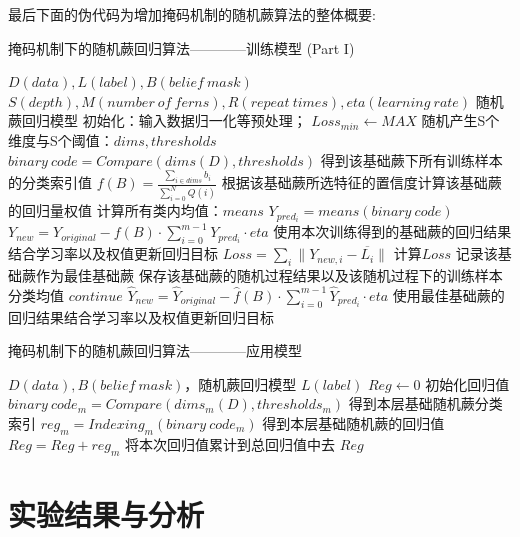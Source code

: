 最后下面的伪代码为增加掩码机制的随机蕨算法的整体概要:

\begin{algorithm}
\caption{掩码机制下的随机蕨回归算法————训练模型 (Part I)}
\begin{algorithmic}[1]
\Require $D(data), L(label), B(belief\ mask)$
\Require $S(depth), M(number\ of\ ferns), R(repeat\ times), eta(learning\ rate)$
\Ensure 随机蕨回归模型
\State 初始化：输入数据归一化等预处理；
	\State $Loss_{min}\leftarrow MAX$
		\State 随机产生S个维度与S个阈值：$dims, thresholds$
		\State $binary\ code=Compare(dims(D), thresholds)$
		\State \Comment 得到该基础蕨下所有训练样本的分类索引值
		\State $f(B)=\frac{\sum_{i\in dims} b_i}{\sum_{i=0}^{N} Q(i)}$
		\State \Comment 根据该基础蕨所选特征的置信度计算该基础蕨的回归量权值
		\State 计算所有类内均值：$means$
		\State $Y_{pred_i}=means(binary\ code)$
		\State $Y_{new}=Y_{original}-f(B)\cdot \sum_{i=0}^{m-1} Y_{pred_i}\cdot eta$
		\State \Comment 使用本次训练得到的基础蕨的回归结果结合学习率以及权值更新回归目标
		\State $Loss=\sum_i{\|Y_{new,i}-\overline{L_i}\|}$
		\State \Comment 计算$Loss$
			\State 记录该基础蕨作为最佳基础蕨
			\State 保存该基础蕨的随机过程结果以及该随机过程下的训练样本分类均值
		\Else 
			\State $continue$
		\EndIf
	\State $\hat{Y}_{new}=\hat{Y}_{original}-\hat{f}(B)\cdot \sum_{i=0}^{m-1} \hat{Y}_{pred_i}\cdot eta$
	\State \Comment 使用最佳基础蕨的回归结果结合学习率以及权值更新回归目标
	\EndFor
\EndFor
\end{algorithmic}
\end{algorithm}

\begin{algorithm}
\caption{掩码机制下的随机蕨回归算法————应用模型}
\begin{algorithmic}[1]
\Require $D(data), B(belief\ mask)$，随机蕨回归模型
\Ensure $L(label)$
\State $Reg\leftarrow 0$
\Comment 初始化回归值
	\State $binary\ code_m=Compare(dims_m(D), thresholds_m)$
	\Comment 得到本层基础随机蕨分类索引
	\State $reg_m=Indexing_m(binary\ code_m)$
	\Comment 得到本层基础随机蕨的回归值
	\State $Reg=Reg+reg_m$
	\Comment 将本次回归值累计到总回归值中去
\EndFor
\State \Return $Reg$
\end{algorithmic}
\end{algorithm}


\newpage

\section{实验结果与分析} %

